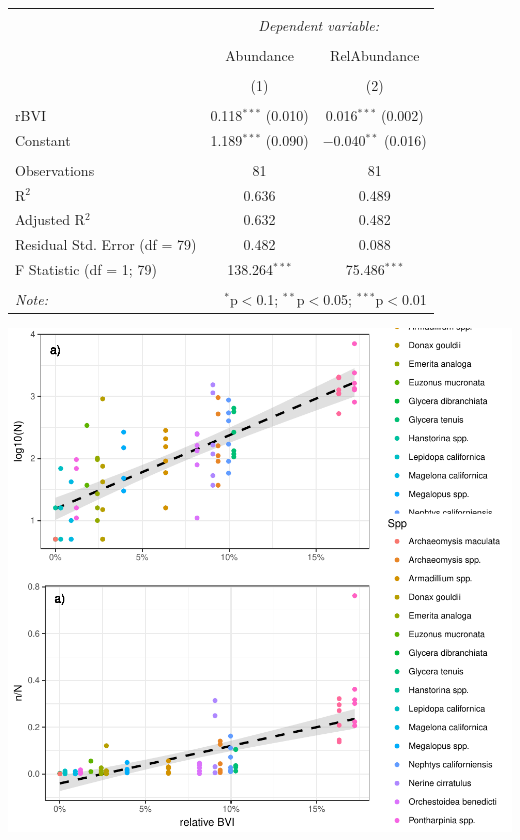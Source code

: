\documentclass[12pt,]{article}
\begin{document}
\begin{table}[!htbp] \centering 
  \caption{} 
  \label{} 
\begin{tabular}{@{\extracolsep{5pt}}lcc} 
\\[-1.8ex]\hline 
\hline \\[-1.8ex] 
 & \multicolumn{2}{c}{\textit{Dependent variable:}} \\ 
\cline{2-3} 
\\[-1.8ex] & Abundance & RelAbundance \\ 
\\[-1.8ex] & (1) & (2)\\ 
\hline \\[-1.8ex] 
 rBVI & 0.118$^{***}$ (0.010) & 0.016$^{***}$ (0.002) \\ 
  Constant & 1.189$^{***}$ (0.090) & $-$0.040$^{**}$ (0.016) \\ 
 \hline \\[-1.8ex] 
Observations & 81 & 81 \\ 
R$^{2}$ & 0.636 & 0.489 \\ 
Adjusted R$^{2}$ & 0.632 & 0.482 \\ 
Residual Std. Error (df = 79) & 0.482 & 0.088 \\ 
F Statistic (df = 1; 79) & 138.264$^{***}$ & 75.486$^{***}$ \\ 
\hline 
\hline \\[-1.8ex] 
\textit{Note:}  & \multicolumn{2}{r}{$^{*}$p$<$0.1; $^{**}$p$<$0.05; $^{***}$p$<$0.01} \\ 
\end{tabular} 
\end{table}

\includegraphics{BVI_Manuscript_files/figure-latex/unnamed-chunk-7-1.pdf}
\end{document}
